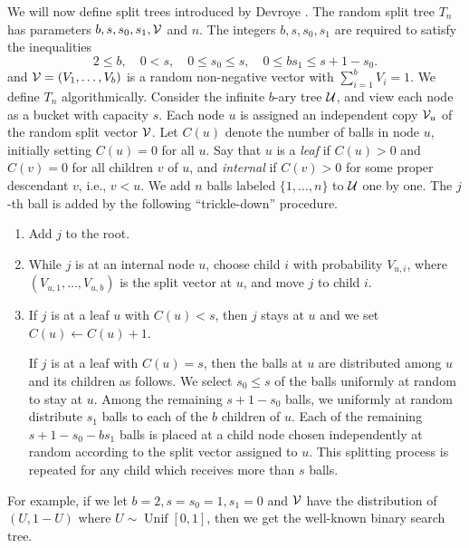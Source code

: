 \documentclass[11pt]{article}
\newcommand\cU{{\cal U}}
\newcommand\cV{{\cal V}}
\numberwithin{theorem}{section}
\theoremstyle{definition}
\newcommand{\Unif}{\mathop{\mathrm{Unif}}}
\numberwithin{equation}{section}
\begin{document}
We will now define split trees introduced by Devroye \cite{MR1634354}.
The random split tree $T_n$ has parameters $b, s, s_0, s_1, \cV$ and $n$. The integers $b, s, s_0, s_1$ are required to satisfy the inequalities
\begin{equation}
    2 \le b, \quad 0 < s, \quad 0\leq s_0\leq s, \quad 0\leq bs_1\leq s+1-s_0.
    \label{eq:split:para}
\end{equation}
and $\cV=(V_1,\dots,V_b)$ is a random non-negative vector with 
\(\sum_{i=1}^b V_i = 1\).
We define $T_n$ algorithmically. 
Consider the infinite $b$-ary tree $\cU$, and view each node as a
bucket with capacity $s$. Each node $u$ is assigned an independent copy 
$\cV_u$ of the random split vector $\cV$.
Let
$C(u)$ denote the number of balls in node $u$, initially setting $C(u) = 0$ for all $u$. Say that
$u$ is a {\em leaf} if $C(u) > 0$ and $C(v) = 0$ for all children $v$ of
$u$, and {\em internal} if 
$C(v) > 0$ for some proper descendant $v$, i.e., \(v < u\). We add $n$ balls labeled $\{1,\dots,n\}$ to $\cU$
one by one. The $j$-th ball is added by the following ``trickle-down'' procedure.
\begin{enumerate}
\item Add $j$ to the root.
\item While $j$ is at an internal node $u$, choose child $i$ with probability $V_{u,i}$, where
    $(V_{u,1}, \dots,V_{u,b})$ is the split vector at $u$, and move $j$ to child $i$.
\item If $j$ is at a leaf $u$ with $C(u) < s$, then $j$ stays at $u$ and we set $C(u) \leftarrow C(u) + 1$.

If $j$ is at a leaf with $C(u) = s$, then the balls at $u$ are distributed among $u$ and its
children as follows. We select $s_0\leq s$ of the balls uniformly at random to stay at $u$. Among
the remaining $s+1-s_0$ balls, we uniformly at random distribute $s_1$ balls to each of the $b$
children of $u$. Each of the remaining $s+1-s_0-bs_1$ balls is placed at a child node 
chosen independently at random according to the split vector assigned to \(u\).
This splitting process is repeated for any child which receives more than $s$ balls.
\end{enumerate}
For example, if we let \(b=2, s=s_0=1, s_{1}=0\) and \(\cV\) have the
distribution of \( (U, 1-U)\) where \(U \sim \Unif[0,1]\), then
we get the well-known binary search tree.
\end{document}
